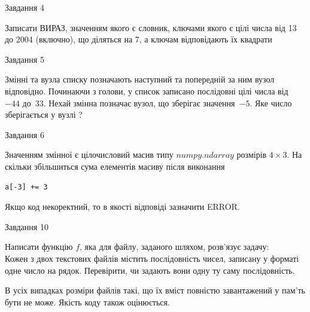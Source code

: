 \documentclass[12pt, ukrainian]{article}
\begin{document}
{\begin{minipage}[t]{8.0cm}
\end{minipage}


               
{\begin{center}Завдання {4}\end{center}}
\vspace{-4mm}
Записати ВИРАЗ, значенням якого є словник, ключами якого є цілі числа від 13 до 2004 (включно), що діляться на 7, а ключам відповідають їх квадрати\par

\vspace{10mm}
               
{\begin{center}Завдання {5}\end{center}}
\vspace{-4mm}
Змінні  та  вузла списку позначають наступний та попередній за ним вузол відповідно. Починаючи з голови, у список записано послідовні цілі числа від~$-44$ до~$33$. Нехай змінна  позначає вузол, що зберігає значення~$-5$.
Яке число зберігається у вузлі  ?\par

               
{\begin{center}Завдання {6}\end{center}}
\vspace{-4mm}
Значенням змінної  є цілочисловий масив типу $numpy.ndarray$ розмірів $4{\times}3$. На скільки збільшиться сума елементів масиву  після виконання
\begin{verbatim}
a[-3] += 3
\end{verbatim}


Якщо код некоректний, то в якості відповіді зазначити ERROR.\par

               
{\begin{center}Завдання {10}\end{center}}
\vspace{-4mm}

Написати функцію $f$, яка для файлу, заданого шляхом, розв’язує задачу:\\ Кожен з двох текстових файлів містить послідовність чисел, записану у форматі одне число на рядок.  Перевірити, чи задають вони одну ту саму послідовність.

В усіх випадках розміри файлів такі, що їх вміст повністю завантажений у пам'ть бути не може. Якість коду також оцінюється.



}
\end{document}
